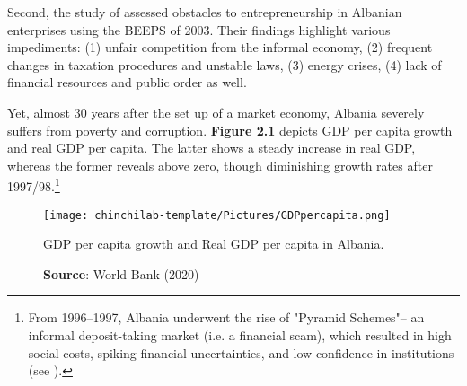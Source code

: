 Second, the study of \citet{bitzenis2005obstacles} assessed obstacles to entrepreneurship in Albanian enterprises using the BEEPS of 2003. Their findings highlight various impediments: (1) unfair competition from the informal economy, (2) frequent changes in taxation procedures and unstable laws, (3) energy crises, (4) lack of financial resources and public order as well. 

Yet, almost 30 years after the set up of a market economy, Albania severely suffers from poverty and corruption. {\bf Figure 2.1} depicts GDP per capita growth and real GDP per capita. The latter shows a steady increase in real GDP, whereas the former reveals above zero, though diminishing growth rates after 1997/98.\footnote{From 1996--1997, Albania underwent the rise of "Pyramid Schemes"-- an informal deposit-taking market (i.e. a financial scam), which resulted in high social costs, spiking financial uncertainties, and low confidence in institutions (see \citet{jarvis2000rise}).}
\begin{figure}[h]
    \centering
    \texttt{[image: chinchilab-template/Pictures/GDPpercapita.png]}
    \caption{GDP per capita growth and Real GDP per capita in Albania.}
    \caption*{\textbf{Source}: World Bank (2020)}
    \label{fig:my_label}
\end{figure}

